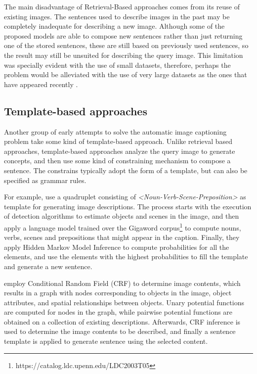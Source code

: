 The main disadvantage of Retrieval-Based approaches comes from its reuse of existing images. The sentences used to describe images in the past may be completely inadequate for describing a new image. Although some of the proposed models are able to compose new sentences rather than just returning one of the stored sentences, these are still based on previously used sentences, so the result may still be unsuited for describing the query image. This limitation was specially evident with the use of small datasets, therefore, perhaps the problem would be alleviated with the use of very large datasets as the ones that have appeared recently \citet{Lin2014, Sharma2018}.

\subsection{Template-based approaches}

Another group of early attempts to solve the automatic image captioning problem take some kind of template-based approach. Unlike retrieval based approaches, template-based approaches analyze the query image to generate concepts, and then use some kind of constraining mechanism to compose a sentence. The constrains typically adopt the form of a template, but can also be specified as grammar rules.

For example, \citet{Yang2011} use a quadruplet consisting of \textit{<Noun-Verb-Scene-Preposition>} as template for generating image descriptions. The process starts with the execution of detection algorithms to estimate objects and scenes in the image, and then apply a language model trained over the Gigaword corpus\footnote{https://catalog.ldc.upenn.edu/LDC2003T05} to compute nouns, verbs, scenes and prepositions that might appear in the caption. Finally, they apply Hidden Markov Model Inference to compute probabilities for all the elements, and use the elements with the highest probabilities to fill the template and generate a new sentence.

\citet{Kulkarni2011} employ Conditional Random Field (CRF) to determine image contents, which results in a graph with nodes corresponding to objects in the image, object attributes, and spatial relationships between objects. Unary potential functions are computed for nodes in the graph, while pairwise potential functions are obtained on a collection of existing descriptions. Afterwards, CRF inference is used to determine the image contents to be described, and finally a sentence template is applied to generate sentence using the selected content.

